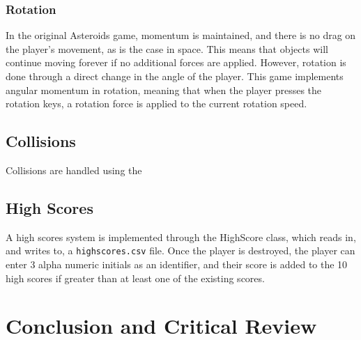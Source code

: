\documentclass[12pt, a4paper]{article}
\begin{document}
\subsubsection{Rotation}

In the original Asteroids game, momentum is maintained, and there is no drag on the player's movement, as is the case in space. This means that objects will continue moving forever if no additional forces are applied. However, rotation is done through a direct change in the angle of the player. This game implements angular momentum in rotation, meaning that when the player presses the rotation keys, a rotation force is applied to the current rotation speed.


\subsection{Collisions}

Collisions are handled using the

\subsection{High Scores}

A high scores system is implemented through the HighScore class, which reads in, and writes to, a \texttt{highscores.csv} file. Once the player is destroyed, the player can enter 3 alpha numeric initials as an identifier, and their score is added to the 10 high scores if greater than at least one of the existing scores.

\section{Conclusion and Critical Review}
\end{document}
